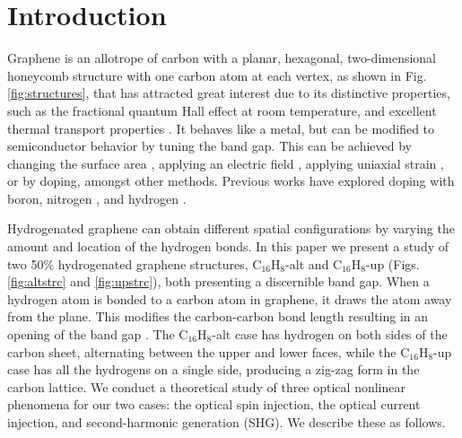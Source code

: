 \documentclass[pss]{wiley2sp} %
\begin{document}
\maketitle


\section{Introduction}\label{sec:intro}

Graphene is an allotrope of carbon with a planar, hexagonal, two-dimensional
honeycomb structure with one carbon atom at each vertex, as shown in Fig.
\ref{fig:structures}, that has attracted great interest due to its distinctive
properties, such as the fractional quantum Hall effect at room temperature,
and excellent thermal transport properties
\cite{geimNM07,reinaNL08,novoselov2S7,balandinNL08}. It behaves
like a metal, but can be modified to semiconductor behavior by tuning the band
gap. This can be achieved by changing the surface area \cite{hanPRL07},
applying an electric field \cite{zhangN09}, applying uniaxial strain
\cite{niACSN08}, or by doping, amongst other methods. Previous works have
explored doping with boron, nitrogen \cite{guoIJ11}, and hydrogen
\cite{eliasS09,guisingerNL09,samarakoonACSN10}.

Hydrogenated graphene can obtain different spatial configurations by varying
the amount and location of the hydrogen bonds. In this paper we present a
study of two 50\% hydrogenated graphene structures, C$_{16}$H$_{8}$-alt and
C$_{16}$H$_{8}$-up (Figs. \ref{fig:altstrc} and \ref{fig:upstrc}), both
presenting a discernible band gap. When a hydrogen atom is bonded to a carbon
atom in graphene, it draws the atom away from the plane. This modifies the
carbon-carbon bond length resulting in an opening of the band gap
\cite{samarakoonACSN10}. The C$_{16}$H$_{8}$-alt case has hydrogen on both
sides of the carbon sheet, alternating between the upper and lower faces,
while the C$_{16}$H$_{8}$-up case has all the hydrogens on a single side,
producing a zig-zag form in the carbon lattice. We conduct a theoretical study
of three optical nonlinear phenomena for our two cases: the optical spin
injection, the optical current injection, and second-harmonic generation
(SHG). We describe these as follows.
\end{document}
